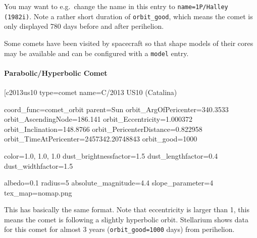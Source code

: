 You may want to e.g.\ change the name in this entry
to \texttt{name=1P/Halley (1982i)}. Note a rather short
duration of \texttt{orbit\_good}, which means the comet is only displayed 780
days before and after perihelion.

Some comets have been visited by spacecraft so that shape models of their cores 
may be available and can be configured with a \texttt{model} entry.

\paragraph{Parabolic/Hyperbolic Comet}
\label{sec:ssystem.ini:Comet:Parabolic}

\begin{configfile}
[c2013us10%
type=comet
name=C/2013 US10 (Catalina)

coord_func=comet_orbit
parent=Sun 
orbit_ArgOfPericenter=340.3533
orbit_AscendingNode=186.141
orbit_Eccentricity=1.000372
orbit_Inclination=148.8766
orbit_PericenterDistance=0.822958
orbit_TimeAtPericenter=2457342.20748843
orbit_good=1000

color=1.0, 1.0, 1.0
dust_brightnessfactor=1.5
dust_lengthfactor=0.4
dust_widthfactor=1.5

albedo=0.1
radius=5
absolute_magnitude=4.4
slope_parameter=4
tex_map=nomap.png
\end{configfile}

This has basically the same format. Note that eccentricity is larger than 1,
this means the comet is following a slightly hyperbolic
orbit. Stellarium shows data for this comet for almost 3 years
(\texttt{orbit\_good=1000} days) from perihelion.





